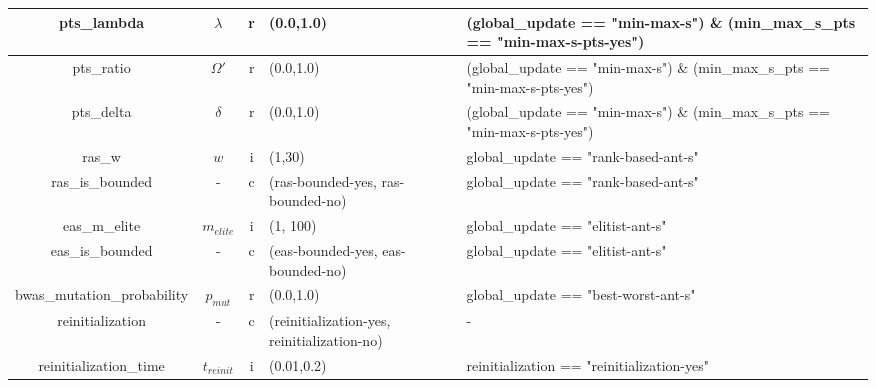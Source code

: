 \documentclass[11pt,a4paper,oneside]{book}
\begin{document}
\begin{table}[]
\begin{tabular}{|c|c|c|p{4cm}|p{4cm}|}
pts\_lambda                     & $\lambda$  & r    & (0.0,1.0)                                                                      & (global\_update == "min-max-s") \& (min\_max\_s\_pts == "min-max-s-pts-yes")                  \\ \hline
pts\_ratio                      & $\Omega'$  & r    & (0.0,1.0)                                                                      & (global\_update == "min-max-s") \& (min\_max\_s\_pts == "min-max-s-pts-yes")                  \\ \hline
pts\_delta                      & $\delta$   & r    & (0.0,1.0)                                                                      & (global\_update == "min-max-s") \& (min\_max\_s\_pts == "min-max-s-pts-yes")                  \\ \hline
ras\_w                          & $w$        & i    & (1,30)                                                                         & global\_update == "rank-based-ant-s"                                                          \\ \hline
ras\_is\_bounded                & -          & c    & (ras-bounded-yes, ras-bounded-no)                                               & global\_update == "rank-based-ant-s"                                                          \\ \hline
eas\_m\_elite                   & $m_{elite}$ & i   & (1, 100)                                                                       & global\_update == "elitist-ant-s"                                                             \\ \hline
eas\_is\_bounded                & -          & c    & (eas-bounded-yes, eas-bounded-no)                                               & global\_update == "elitist-ant-s"                                                             \\ \hline
bwas\_mutation\_probability     & $p_{mut}$    & r    & (0.0,1.0)                                                                      & global\_update == "best-worst-ant-s"                                                          \\ \hline
reinitialization                & -          & c    & (reinitialization-yes, reinitialization-no)                                     & -                                                                                             \\ \hline
reinitialization\_time          & $t_{reinit}$ & i    & (0.01,0.2)                                                                     & reinitialization == "reinitialization-yes"                                                    \\ \hline
\end{tabular}
\end{table}
\end{document}
